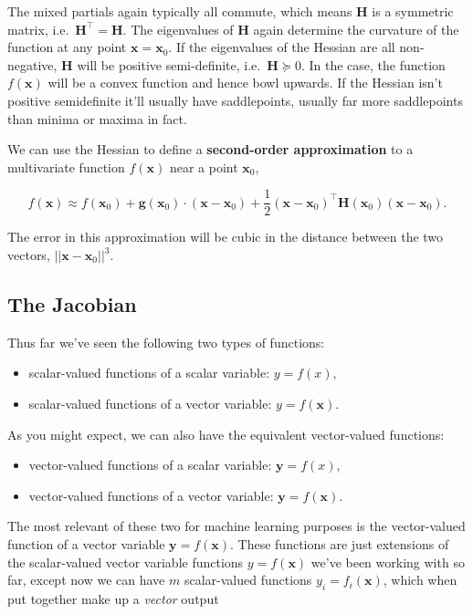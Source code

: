 \documentclass[
  letterpaper,
  DIV=11,
  numbers=noendperiod]{scrreprt}
\providecommand{\tightlist}{%
  \setlength{\itemsep}{0pt}\setlength{\parskip}{0pt}}\usepackage{longtable,booktabs,array}
\begin{document}
The mixed partials again typically all commute, which means
\(\mathbf{H}\) is a symmetric matrix,
i.e.~\(\mathbf{H}^\top = \mathbf{H}\). The eigenvalues of \(\mathbf{H}\)
again determine the curvature of the function at any point
\(\mathbf{x}=\mathbf{x}_0\). If the eigenvalues of the Hessian are all
non-negative, \(\mathbf{H}\) will be positive semi-definite,
i.e.~\(\mathbf{H} \succcurlyeq 0\). In the case, the function
\(f(\mathbf{x})\) will be a convex function and hence bowl upwards. If
the Hessian isn't positive semidefinite it'll usually have saddlepoints,
usually far more saddlepoints than minima or maxima in fact.

We can use the Hessian to define a \textbf{second-order approximation}
to a multivariate function \(f(\mathbf{x})\) near a point
\(\mathbf{x}_0\),

\[f(\mathbf{x}) \approx f(\mathbf{x}_0) + \mathbf{g}(\mathbf{x}_0) \cdot (\mathbf{x} - \mathbf{x}_0) + \frac{1}{2}(\mathbf{x} - \mathbf{x}_0)^\top \mathbf{H}(\mathbf{x}_0) (\mathbf{x} - \mathbf{x}_0).\]

The error in this approximation will be cubic in the distance between
the two vectors, \(||\mathbf{x} - \mathbf{x}_0||^3\).

\hypertarget{the-jacobian}{%
\subsection{The Jacobian}\label{the-jacobian}}

Thus far we've seen the following two types of functions:

\begin{itemize}
\tightlist
\item
  scalar-valued functions of a scalar variable: \(y=f(x)\),
\item
  scalar-valued functions of a vector variable: \(y = f(\mathbf{x})\).
\end{itemize}

As you might expect, we can also have the equivalent vector-valued
functions:

\begin{itemize}
\tightlist
\item
  vector-valued functions of a scalar variable: \(\mathbf{y} = f(x)\),
\item
  vector-valued functions of a vector variable:
  \(\mathbf{y} = f(\mathbf{x})\).
\end{itemize}

The most relevant of these two for machine learning purposes is the
vector-valued function of a vector variable
\(\mathbf{y} = f(\mathbf{x})\). These functions are just extensions of
the scalar-valued vector variable functions \(y = f(\mathbf{x})\) we've
been working with so far, except now we can have \(m\) scalar-valued
functions \(y_i = f_i(\mathbf{x})\), which when put together make up a
\emph{vector} output
\end{document}
